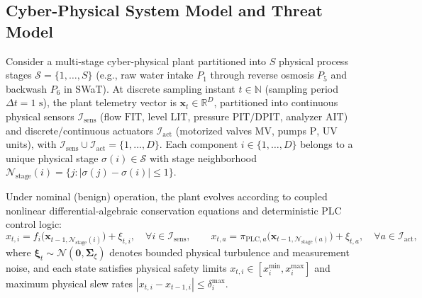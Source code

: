 \documentclass[10pt,a4paper]{article}
\begin{document}
\subsection{Cyber-Physical System Model and Threat Model}

Consider a multi-stage cyber-physical plant partitioned into $S$ physical process stages $\mathcal{S} = \{1, \dots, S\}$ (e.g., raw water intake $P_1$ through reverse osmosis $P_5$ and backwash $P_6$ in SWaT). At discrete sampling instant $t \in \mathbb{N}$ (sampling period $\Delta t = 1\text{ s}$), the plant telemetry vector is $\mathbf{x}_t \in \mathbb{R}^D$, partitioned into continuous physical sensors $\mathcal{I}_{\text{sens}}$ (flow $\text{FIT}$, level $\text{LIT}$, pressure $\text{PIT}/\text{DPIT}$, analyzer $\text{AIT}$) and discrete/continuous actuators $\mathcal{I}_{\text{act}}$ (motorized valves $\text{MV}$, pumps $\text{P}$, UV units), with $\mathcal{I}_{\text{sens}} \cup \mathcal{I}_{\text{act}} = \{1, \dots, D\}$. Each component $i \in \{1, \dots, D\}$ belongs to a unique physical stage $\sigma(i) \in \mathcal{S}$ with stage neighborhood $\mathcal{N}_{\text{stage}}(i) = \{j : |\sigma(j) - \sigma(i)| \le 1\}$.

Under nominal (benign) operation, the plant evolves according to coupled nonlinear differential-algebraic conservation equations and deterministic PLC control logic:
\begin{equation}\label{eq:plant_dynamics}
    x_{t,i} = f_i\big(\mathbf{x}_{t-1, \mathcal{N}_{\text{stage}}(i)}\big) + \xi_{t,i}, \quad \forall i \in \mathcal{I}_{\text{sens}}, \qquad
    x_{t,a} = \pi_{\text{PLC},a}\big(\mathbf{x}_{t-1, \mathcal{N}_{\text{stage}}(a)}\big) + \xi_{t,a}, \quad \forall a \in \mathcal{I}_{\text{act}},
\end{equation}
where $\boldsymbol{\xi}_t \sim \mathcal{N}(\mathbf{0}, \boldsymbol{\Sigma}_\xi)$ denotes bounded physical turbulence and measurement noise, and each state satisfies physical safety limits $x_{t,i} \in [x_i^{\min}, x_i^{\max}]$ and maximum physical slew rates $|x_{t,i} - x_{t-1,i}| \le \delta_i^{\max}$.
\end{document}
